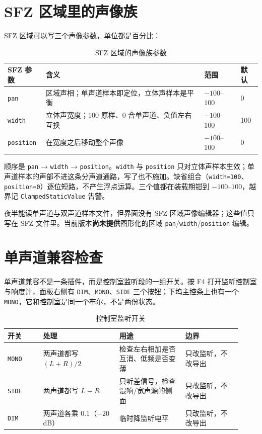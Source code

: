 \section{SFZ 区域里的声像族}

SFZ 区域可以写三个声像参数，单位都是百分比：

\begin{table}[htbp]
\centering
\small
\begin{tabular}{@{}llll@{}}
\hline
SFZ 参数 & 含义 & 范围 & 默认 \\
\hline
\texttt{pan} & 区域声相；单声道样本即定位，立体声样本是平衡 & $-100$–$100$ & 0 \\
\texttt{width} & 立体声宽度；$100$ 原样、$0$ 合单声道、负值左右互换 & $-100$–$100$ & 100 \\
\texttt{position} & 在宽度之后移动整个声像 & $-100$–$100$ & 0 \\
\hline
\end{tabular}
\caption{SFZ 区域的声像族参数}
\label{tab:sfz-pan-family}
\end{table}

顺序是 \texttt{pan} → \texttt{width} → \texttt{position}。\texttt{width} 与 \texttt{position} 只对立体声样本生效；单声道样本的声部不进这条分声道通路，写了也不施加。缺省组合（\texttt{width=100}、\texttt{position=0}）逐位短路，不产生浮点运算。三个值都在装载期钳到 $-100$–$100$，越界记 \texttt{ClampedStaticValue} 告警。

夜半能读单声道与双声道样本文件，但界面没有 SFZ 区域声像编辑器；这些值只写在 SFZ 文件里。当前版本\textbf{尚未提供}图形化的区域 \texttt{pan}/\texttt{width}/\texttt{position} 编辑。

\section{单声道兼容检查}

单声道兼容不是一条插件，而是控制室监听段的一组开关。按 F4 打开监听控制室与响度计，面板右侧有 \texttt{DIM}、\texttt{MONO}、\texttt{SIDE} 三个按钮；下坞主控条上也有一个 \texttt{MONO}，它和控制室是同一个布尔，不是两份状态。


\begin{table}[htbp]
\centering
\small
\begin{tabular}{@{}p{0.14\linewidth}p{0.30\linewidth}p{0.26\linewidth}p{0.22\linewidth}@{}}
\hline
开关 & 处理 & 用途 & 边界 \\
\hline
\texttt{MONO} & 两声道都写 $(L+R)/2$ & 检查左右相加是否互消、低频是否变薄 & 只改监听，不改导出 \\
\texttt{SIDE} & 两声道都写 $L-R$ & 只听差信号，检查混响/宽声源的侧面 & 只改监听，不改导出 \\
\texttt{DIM} & 两声道各乘 $0.1$（$-20$ dB） & 临时降监听电平 & 只改监听，不改导出 \\
\hline
\end{tabular}
\caption{控制室监听开关}
\label{tab:monitor-controls}
\end{table}

